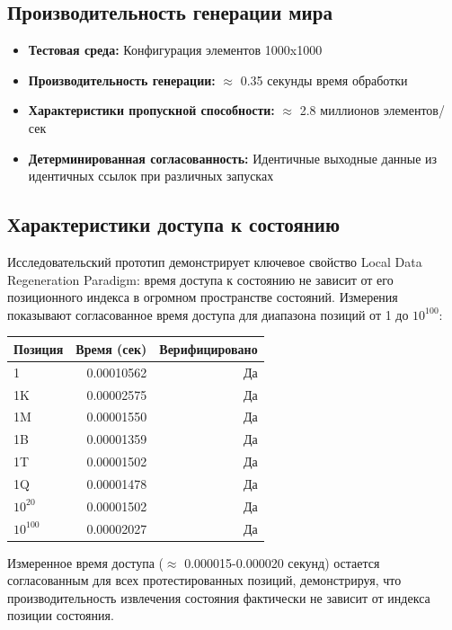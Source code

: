 \documentclass[14pt, a4paper]{extarticle}
\begin{document}
\subsection{Производительность генерации мира}
\begin{itemize}
    \item \textbf{Тестовая среда:} Конфигурация элементов 1000x1000
    \item \textbf{Производительность генерации:} $\approx$ 0.35 секунды время обработки
    \item \textbf{Характеристики пропускной способности:} $\approx$ 2.8 миллионов элементов/сек
    \item \textbf{Детерминированная согласованность:} Идентичные выходные данные из идентичных ссылок при различных запусках
\end{itemize}

\subsection{Характеристики доступа к состоянию}
Исследовательский прототип демонстрирует ключевое свойство Local Data Regeneration Paradigm: время доступа к состоянию не зависит от его позиционного индекса в огромном пространстве состояний. Измерения показывают согласованное время доступа для диапазона позиций от 1 до $10^{100}$:

\begin{center}
\begin{tabular}{|l|r|r|}
\hline
\textbf{Позиция} & \textbf{Время (сек)} & \textbf{Верифицировано} \\
\hline
1 & 0.00010562 & Да \\
1K & 0.00002575 & Да \\
1M & 0.00001550 & Да \\
1B & 0.00001359 & Да \\
1T & 0.00001502 & Да \\
1Q & 0.00001478 & Да \\
$10^{20}$ & 0.00001502 & Да \\
$10^{100}$ & 0.00002027 & Да \\
\hline
\end{tabular}
\end{center}

Измеренное время доступа ($\approx$ 0.000015-0.000020 секунд) остается согласованным для всех протестированных позиций, демонстрируя, что производительность извлечения состояния фактически не зависит от индекса позиции состояния.
\end{document}

